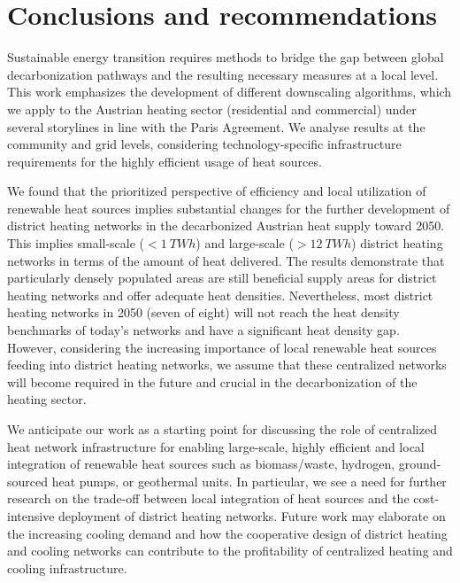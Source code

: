 \section{Conclusions and recommendations}\label{conclusions}
Sustainable energy transition requires methods to bridge the gap between global decarbonization pathways and the resulting necessary measures at a local level. This work emphasizes the development of different downscaling algorithms, which we apply to the Austrian heating sector (residential and commercial) under several storylines in line with the Paris Agreement. We analyse results at the community and grid levels, considering technology-specific infrastructure requirements for the highly efficient usage of heat sources.\vspace{0.3cm}

We found that the prioritized perspective of efficiency and local utilization of renewable heat sources implies substantial changes for the further development of district heating networks in the decarbonized Austrian heat supply toward 2050. This implies small-scale ($<\SI{1}{TWh}$) and large-scale ($>\SI{12}{TWh}$) district heating networks in terms of the amount of heat delivered. The results demonstrate that particularly densely populated areas are still beneficial supply areas for district heating networks and offer adequate heat densities. Nevertheless, most district heating networks in 2050 (seven of eight) will not reach the heat density benchmarks of today's networks and have a significant heat density gap. However, considering the increasing importance of local renewable heat sources feeding into district heating networks, we assume that these centralized networks will become required in the future and crucial in the decarbonization of the heating sector.\vspace{0.3cm}

We anticipate our work as a starting point for discussing the role of centralized heat network infrastructure for enabling large-scale, highly efficient and local integration of renewable heat sources such as biomass/waste, hydrogen, ground-sourced heat pumps, or geothermal units. In particular, we see a need for further research on the trade-off between local integration of heat sources and the cost-intensive deployment of district heating networks. Future work may elaborate on the increasing cooling demand and how the cooperative design of district heating and cooling networks can contribute to the profitability of centralized heating and cooling infrastructure.